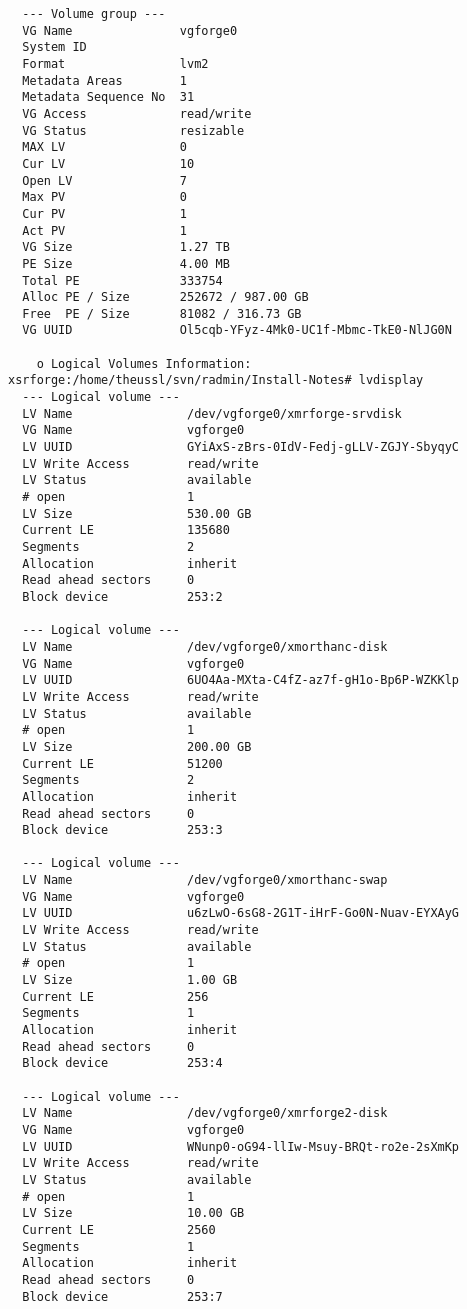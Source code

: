 \documentclass[a4paper]{article}
\begin{document}
\begin{verbatim}
  --- Volume group ---
  VG Name               vgforge0
  System ID             
  Format                lvm2
  Metadata Areas        1
  Metadata Sequence No  31
  VG Access             read/write
  VG Status             resizable
  MAX LV                0
  Cur LV                10
  Open LV               7
  Max PV                0
  Cur PV                1
  Act PV                1
  VG Size               1.27 TB
  PE Size               4.00 MB
  Total PE              333754
  Alloc PE / Size       252672 / 987.00 GB
  Free  PE / Size       81082 / 316.73 GB
  VG UUID               Ol5cqb-YFyz-4Mk0-UC1f-Mbmc-TkE0-NlJG0N

	o Logical Volumes Information:
xsrforge:/home/theussl/svn/radmin/Install-Notes# lvdisplay
  --- Logical volume ---
  LV Name                /dev/vgforge0/xmrforge-srvdisk
  VG Name                vgforge0
  LV UUID                GYiAxS-zBrs-0IdV-Fedj-gLLV-ZGJY-SbyqyC
  LV Write Access        read/write
  LV Status              available
  # open                 1
  LV Size                530.00 GB
  Current LE             135680
  Segments               2
  Allocation             inherit
  Read ahead sectors     0
  Block device           253:2
   
  --- Logical volume ---
  LV Name                /dev/vgforge0/xmorthanc-disk
  VG Name                vgforge0
  LV UUID                6UO4Aa-MXta-C4fZ-az7f-gH1o-Bp6P-WZKKlp
  LV Write Access        read/write
  LV Status              available
  # open                 1
  LV Size                200.00 GB
  Current LE             51200
  Segments               2
  Allocation             inherit
  Read ahead sectors     0
  Block device           253:3
   
  --- Logical volume ---
  LV Name                /dev/vgforge0/xmorthanc-swap
  VG Name                vgforge0
  LV UUID                u6zLwO-6sG8-2G1T-iHrF-Go0N-Nuav-EYXAyG
  LV Write Access        read/write
  LV Status              available
  # open                 1
  LV Size                1.00 GB
  Current LE             256
  Segments               1
  Allocation             inherit
  Read ahead sectors     0
  Block device           253:4
   
  --- Logical volume ---
  LV Name                /dev/vgforge0/xmrforge2-disk
  VG Name                vgforge0
  LV UUID                WNunp0-oG94-llIw-Msuy-BRQt-ro2e-2sXmKp
  LV Write Access        read/write
  LV Status              available
  # open                 1
  LV Size                10.00 GB
  Current LE             2560
  Segments               1
  Allocation             inherit
  Read ahead sectors     0
  Block device           253:7
   

\end{verbatim}
\end{document}
